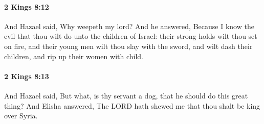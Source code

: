 		\paragraph{2 Kings 8:12} %
			\label{2KINGS-8-12}

			And Hazael said, Why weepeth my lord? And he answered, Because I know the evil that thou wilt do unto the children of Israel: their strong holds wilt thou set on fire, and their young men wilt thou slay with the sword, and wilt dash their children, and rip up their women with child.


		\paragraph{2 Kings 8:13} %
			\label{2KINGS-8-13}

			And Hazael said, But what, is thy servant a dog, that he should do this great thing? And Elisha answered, The LORD hath shewed me that thou shalt be king over Syria.

